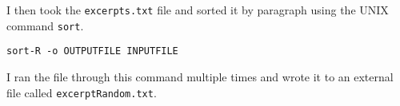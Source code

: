 \documentclass{article}
\begin{document}
I then took the \texttt{excerpts.txt} file and sorted it by paragraph using the UNIX command \texttt{sort}.

\begin{exe}
 \ex \texttt{sort-R -o OUTPUTFILE INPUTFILE}
\end{exe}

I ran the file through this command multiple times and wrote it to an external file called \texttt{excerptRandom.txt}.

% 
% 
% 	
% 
% 	
% 
% 
% 	
   
\end{document}
